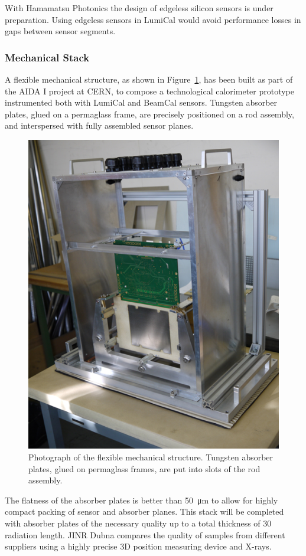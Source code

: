 With Hamamatsu Photonics the design of
edgeless silicon sensors is under preparation. Using edgeless sensors in LumiCal would avoid performance losses
in gaps between sensor segments.


\subsubsection{Mechanical Stack}

A flexible mechanical structure, as shown in  Figure~\ref{fig:mechanical_structure}, has been built as part of the AIDA I project at CERN,
to compose a technological
calorimeter prototype instrumented both with LumiCal and BeamCal sensors.
Tungsten absorber plates, glued on a permaglass
frame, are precisely
positioned on a rod assembly, and interspersed with fully assembled sensor planes.
\begin{figure}[hbp]
\centering
\includegraphics[width=0.6\columnwidth,]{Calorimeter/FCAL/figs/mechanical_structure_2}
\caption{Photograph of the flexible mechanical structure. Tungsten absorber plates, glued on permaglass frames, are put into slots of the
rod assembly.}
\label{fig:mechanical_structure}
\end{figure}
The flatness of the absorber plates is better than \SI{50}{\micro\meter} to allow for highly compact packing of sensor and absorber planes. This stack will be completed
with absorber plates of the necessary quality up to a total thickness of 30 radiation length. JINR Dubna compares the quality
of samples from
different suppliers using a highly precise 3D position measuring device and X-rays.

